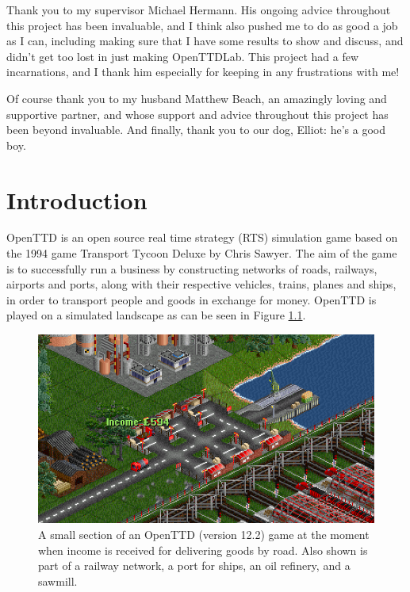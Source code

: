 \documentclass[logo,msc,dsti]{infthesis}    %
\begin{document}
\begin{preliminary}
\begin{acknowledgements}
Thank you to my supervisor Michael Hermann. His ongoing advice throughout this project has been invaluable, and I think also pushed me to do as good a job as I can, including making sure that I have some results to show and discuss, and didn't get too lost in just making OpenTTDLab. This project had a few incarnations, and I thank him especially for keeping in any frustrations with me!

Of course thank you to my husband Matthew Beach, an amazingly loving and supportive partner, and whose support and advice throughout this project has been beyond invaluable. And finally, thank you to our dog, Elliot: he's a good boy.

\end{acknowledgements}


\tableofcontents
\end{preliminary}


\chapter{Introduction}

OpenTTD \cite{openttd} is an open source real time strategy (RTS) simulation game based on the 1994 game Transport Tycoon Deluxe by Chris Sawyer. The aim of the game is to successfully run a business by constructing networks of roads, railways, airports and ports, along with their respective vehicles, trains, planes and ships, in order to transport people and goods in exchange for money. OpenTTD is played on a simulated landscape as can be seen in Figure \ref{fig:openttd}.

\begin{figure}[h]
\centering
\includegraphics[width=\columnwidth]{assets/openttd-screenshot.png}
\caption{A small section of an OpenTTD (version 12.2) game at the moment when income is received for delivering goods by road. Also shown is part of a railway network, a port for ships, an oil refinery, and a sawmill.}
\label{fig:openttd}
\end{figure}
\end{document}
